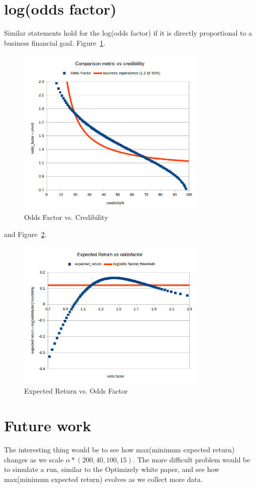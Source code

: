 \documentclass[letterpaper,12pt]{article}
\begin{document}
\section{log(odds factor)}
Similar statements hold for the log(odds factor) if it is directly
proportional to a business financial goal.
Figure~\ref{fig:odds_factor_vs_cred}.
\begin{figure}[ht!]
\centering
\includegraphics[width=90mm]{odds_factor_vs_cred}
\caption{Odds Factor vs. Credibility \label{fig:odds_factor_vs_cred}}
\end{figure}
and Figure~\ref{fig:exp_return_vs_odds_factor}.
\begin{figure}[ht!]
\centering
\includegraphics[width=90mm]{expected_returns_vs_odds_factor}
\caption{Expected Return vs. Odds Factor \label{fig:exp_return_vs_odds_factor}}
\end{figure}

\section{Future work}
The interesting thing would be to see how max(minimum expected return) changes
as we scale \(\alpha*(200, 40, 100, 15)\). The more difficult problem would
be to simulate a run, similar to the Optimizely white paper, and see
how max(minimum expected return) evolves as we collect more data.
\end{document}
